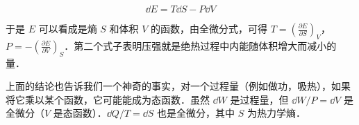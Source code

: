 \begin{equation}
\dd E=T\dd S-P\dd V
\end{equation}

于是 $E$ 可以看成是熵 $S$ 和体积 $V$ 的函数，由全微分式，可得 $T=\left(\frac{\partial E}{\partial S}\right)_V$，$P=-\left(\frac{\partial E}{\partial V}\right)_S$．第二个式子表明压强就是绝热过程中内能随体积增大而减小的量．

上面的结论也告诉我们一个神奇的事实，对一个过程量（例如做功，吸热），如果将它乘以某个函数，它可能能成为态函数．虽然 $\dd W$ 是过程量，但 $\dd W/P=\dd V$ 是全微分（$V$ 是态函数）．$\dd Q/T=\dd S$ 也是全微分，其中 $S$ 为热力学熵．
